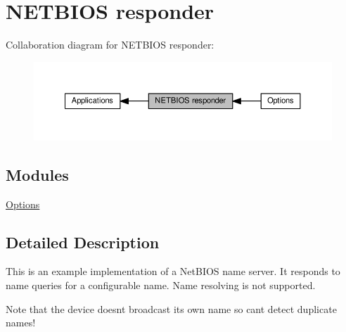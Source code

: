 \hypertarget{group__netbiosns}{}\section{N\+E\+T\+B\+I\+OS responder}
\label{group__netbiosns}
Collaboration diagram for N\+E\+T\+B\+I\+OS responder\+:
\nopagebreak
\begin{figure}[H]
\begin{center}
\leavevmode
\includegraphics[width=350pt]{group__netbiosns}
\end{center}
\end{figure}
\subsection*{Modules}
\begin{DoxyCompactItemize}
\item 
\hyperlink{group__netbiosns__opts}{Options}
\end{DoxyCompactItemize}


\subsection{Detailed Description}
This is an example implementation of a Net\+B\+I\+OS name server. It responds to name queries for a configurable name. Name resolving is not supported.

Note that the device doesn\textquotesingle{}t broadcast it\textquotesingle{}s own name so can\textquotesingle{}t detect duplicate names! 